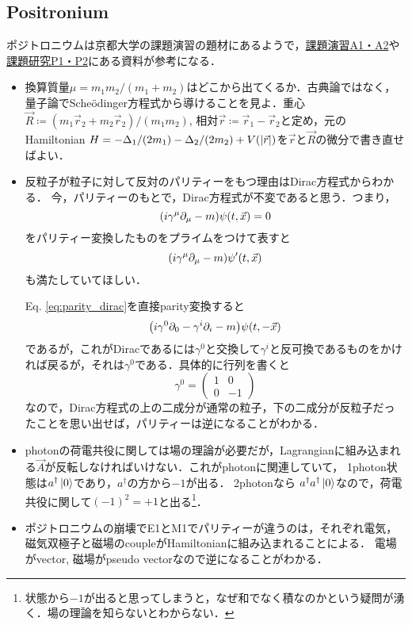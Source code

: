 \subsection{Positronium}
ポジトロニウムは京都大学の課題演習の題材にあるようで，\href{https://www-he.scphys.kyoto-u.ac.jp/gakubu/a1a2.html}{課題演習A1・A2}や\href{https://www-he.scphys.kyoto-u.ac.jp/gakubu/p1p2.html}{課題研究P1・P2}にある資料が参考になる．
\begin{itemize}
		\item 換算質量$\mu = m_1m_2/(m_1 + m_2) $はどこから出てくるか．古典論ではなく，量子論でSche\"{o}dinger方程式から導けることを見よ．重心$\vec{R}\coloneqq (m_1\vec{r}_2+m_2\vec{r}_2)/(m_1m_2) $, 相対$\vec{r}\coloneqq \vec{r}_1-\vec{r}_2$と定め，元のHamiltonian $H = -\Delta_1/(2m_1)-\Delta_2/(2m_2)+V(\abs{\vec{r}}) $を$\vec{r} $と$\vec{R} $の微分で書き直せばよい．
		\item 反粒子が粒子に対して反対のパリティーをもつ理由はDirac方程式からわかる．
				今，パリティーのもとで，Dirac方程式が不変であると思う．つまり，
				\begin{equation}
						\qty(i\gamma^{\mu}\partial_{\mu} - m)\psi(t, \vec{x}) = 0\label{eq:parity_dirac}
				\end{equation}
				をパリティー変換したものをプライムをつけて表すと
				\begin{equation}
						\qty(i\gamma^{\mu}\partial_{\mu}-m)\psi'(t, \vec{x})
				\end{equation}
				も満たしていてほしい．

				Eq. \eqref{eq:parity_dirac}を直接parity変換すると
				\begin{equation}
						\qty(i\gamma^{0}\partial_0 - \gamma^{i}\partial_{i}-m)\psi(t, -\vec{x})
				\end{equation}
				であるが，これがDiracであるには$\gamma^0 $と交換して$\gamma^i $と反可換であるものをかければ戻るが，それは$\gamma^0 $である．具体的に行列を書くと
				\begin{equation}
						\gamma^{0} = \begin{pmatrix}
								1 & 0\\
								0 & -1
						\end{pmatrix}
				\end{equation}
				なので，Dirac方程式の上の二成分が通常の粒子，下の二成分が反粒子だったことを思い出せば，パリティーは逆になることがわかる．
		\item photonの荷電共役に関しては場の理論が必要だが，Lagrangianに組み込まれる$\vec{A} $が反転しなければいけない．これがphotonに関連していて，
				1photon状態は$a^{\dagger}\ket{0} $であり，$a^{\dagger} $の方から$-1 $が出る．
				2photonなら
				$a^{\dagger}a^{\dagger}\ket{0} $なので，荷電共役に関して$(-1)^2=+1 $と出る\footnote{状態から$-1 $が出ると思ってしまうと，なぜ和でなく積なのかという疑問が湧く．場の理論を知らないとわからない．}．
		\item ポジトロニウムの崩壊でE1とM1でパリティーが違うのは，それぞれ電気，磁気双極子と磁場のcoupleがHamiltonianに組み込まれることによる．
				電場がvector, 磁場がpseudo vectorなので逆になることがわかる．
				

\end{itemize}
